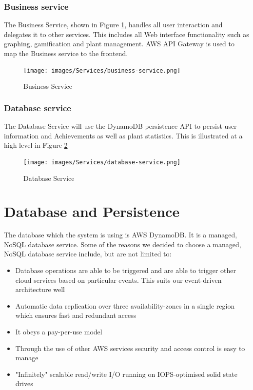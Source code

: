 \documentclass{article}
\begin{document}
\subsubsection{Business service}
The Business Service, shown in Figure \ref{fig:business-service}, handles all user interaction and delegates it to other services. This includes all Web interface functionality such as graphing, gamification and plant management. AWS API Gateway is used to map the Business service to the frontend.

\begin{figure}[h!]
  \texttt{[image: images/Services/business-service.png]}
  \caption{Business Service}
  \label{fig:business-service}
\end{figure}

\subsubsection{Database service} \label{sec:database-service}
The Database Service will use the DynamoDB persistence API to persist user information and Achievements as well as plant statistics. This is illustrated at a high level in Figure \ref{fig:database-service}

\begin{figure}[h!]
  \texttt{[image: images/Services/database-service.png]}
  \caption{Database Service}
  \label{fig:database-service}
\end{figure}

\section{Database and Persistence}
	The database which the system is using is AWS DynamoDB. It is a managed, NoSQL database service. Some of the reasons we decided to choose a managed, NoSQL database service include, but are not limited to:
	\begin{itemize}
		\item Database operations are able to be triggered and are able to trigger other cloud services based on particular events. This suits our event-driven architecture well
		\item Automatic data replication over three availability-zones in a single region which ensures fast and redundant access
		\item It obeys a pay-per-use model
		\item Through the use of other AWS services security and access control is easy to manage
		\item "Infinitely" scalable read/write I/O running on IOPS-optimised solid state drives
	\end{itemize}
\end{document}
